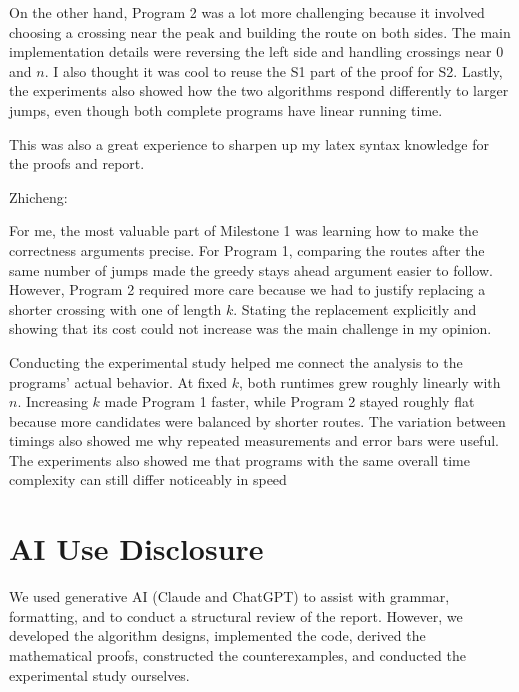 \documentclass{article}
\begin{document}
On the other hand, Program 2 was a lot more challenging because it involved choosing a crossing near the peak and building the route on both sides. The main implementation details were reversing the left side and handling crossings near $0$ and $n$. I also thought it was cool to reuse the S1 part of the proof for S2. Lastly, the experiments also showed how the two algorithms respond differently to larger jumps, even though both complete programs have linear running time.

This was also a great experience to sharpen up my latex syntax knowledge for the proofs and report.

\medskip
\noindent Zhicheng:

For me, the most valuable part of Milestone 1 was learning how to make the correctness arguments precise. For Program 1, comparing the routes after the same number of jumps made the greedy stays ahead argument easier to follow. However, Program 2 required more care because we had to justify replacing a shorter crossing with one of length $k$. Stating the replacement explicitly and showing that its cost could not increase was the main challenge in my opinion.

Conducting the experimental study helped me connect the analysis to the programs' actual behavior. At fixed $k$, both runtimes grew roughly linearly with $n$. Increasing $k$ made Program 1 faster, while Program 2 stayed roughly flat because more candidates were balanced by shorter routes. The variation between timings also showed me why repeated measurements and error bars were useful. The experiments also showed me that programs with the same overall time complexity can still differ noticeably in speed

\section{AI Use Disclosure}
We used generative AI (Claude and ChatGPT) to assist with grammar, formatting, and to conduct a structural review of the report. However, we developed the algorithm designs, implemented the code, derived the mathematical proofs, constructed the counterexamples, and conducted the experimental study ourselves. 
\end{document}
